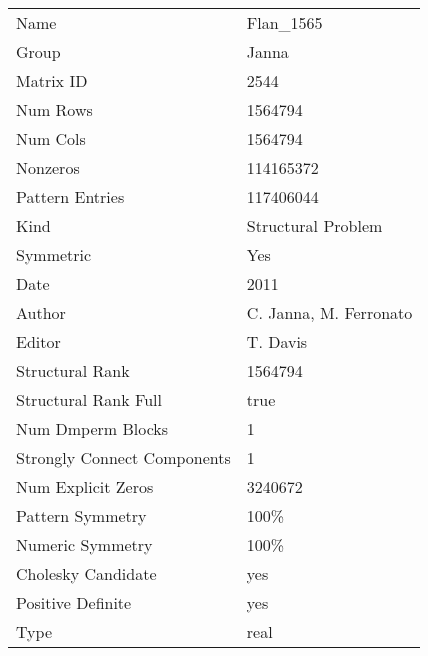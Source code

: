 \begin{tabular}{ll}
\midrule
                       Name &              Flan\_1565 \\
                      Group &                  Janna \\
                  Matrix ID &                   2544 \\
                   Num Rows &                1564794 \\
                   Num Cols &                1564794 \\
                   Nonzeros &              114165372 \\
            Pattern Entries &              117406044 \\
                       Kind &     Structural Problem \\
                  Symmetric &                    Yes \\
                       Date &                   2011 \\
                     Author & C. Janna, M. Ferronato \\
                     Editor &               T. Davis \\
            Structural Rank &                1564794 \\
       Structural Rank Full &                   true \\
          Num Dmperm Blocks &                      1 \\
Strongly Connect Components &                      1 \\
         Num Explicit Zeros &                3240672 \\
           Pattern Symmetry &                   100\% \\
           Numeric Symmetry &                   100\% \\
         Cholesky Candidate &                    yes \\
          Positive Definite &                    yes \\
                       Type &                   real \\
\bottomrule
\end{tabular}

